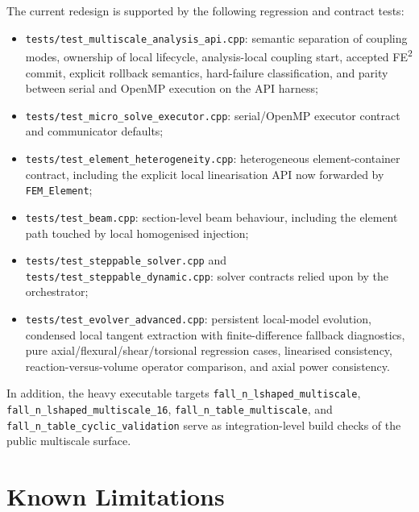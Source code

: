 The current redesign is supported by the following regression and contract
tests:
\begin{itemize}
  \item \texttt{tests/test\_multiscale\_analysis\_api.cpp}:
    semantic separation of coupling modes, ownership of local lifecycle,
    analysis-local coupling start, accepted FE\textsuperscript{2} commit,
    explicit rollback semantics, hard-failure classification, and parity
    between serial and OpenMP execution on the API harness;
  \item \texttt{tests/test\_micro\_solve\_executor.cpp}:
    serial/OpenMP executor contract and communicator defaults;
  \item \texttt{tests/test\_element\_heterogeneity.cpp}:
    heterogeneous element-container contract, including the explicit local
    linearisation API now forwarded by \texttt{FEM\_Element};
  \item \texttt{tests/test\_beam.cpp}:
    section-level beam behaviour, including the element path touched by local
    homogenised injection;
  \item \texttt{tests/test\_steppable\_solver.cpp} and
    \texttt{tests/test\_steppable\_dynamic.cpp}:
    solver contracts relied upon by the orchestrator;
  \item \texttt{tests/test\_evolver\_advanced.cpp}:
    persistent local-model evolution, condensed local tangent extraction with
    finite-difference fallback diagnostics, pure axial/flexural/shear/torsional
    regression cases, linearised consistency, reaction-versus-volume operator
    comparison, and axial power consistency.
\end{itemize}

In addition, the heavy executable targets
\texttt{fall\_n\_lshaped\_multiscale},
\texttt{fall\_n\_lshaped\_multiscale\_16},
\texttt{fall\_n\_table\_multiscale}, and
\texttt{fall\_n\_table\_cyclic\_validation}
serve as integration-level build checks of the public multiscale surface.

\section{Known Limitations}
\label{sec:ms-pub-limitations}

